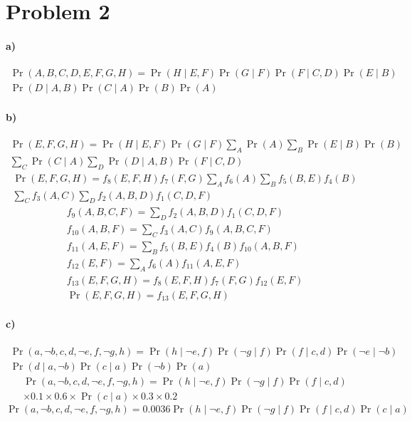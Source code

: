 \documentclass[12pt]{article}
\begin{document}
\section*{Problem 2}

\paragraph{a)}

\begin{multline*}
        \Pr(A,B,C,D,E,F,G,H)=\Pr(H\mid E,F)\Pr(G\mid F)\Pr(F\mid C,D)\Pr(E\mid B)\\
        \Pr(D\mid A,B)\Pr(C\mid A)\Pr(B)\Pr(A)
\end{multline*}

\paragraph{b)}

\begin{multline*}
        \Pr(E,F,G,H)=\Pr(H\mid E,F)\Pr(G\mid F)\sum_A\Pr(A)\sum_B\Pr(E\mid B)\Pr(B)\\
        \sum_C\Pr(C\mid A)\sum_D\Pr(D\mid A,B)\Pr(F\mid C,D)
\end{multline*}
\begin{multline*}
        \Pr(E,F,G,H)=f_8(E,F,H)f_7(F,G)\sum_Af_6(A)\sum_Bf_5(B,E)f_4(B)\\
        \sum_Cf_3(A,C)\sum_Df_2(A,B,D)f_1(C,D,F)
\end{multline*}
\begin{gather*}
        f_9(A,B,C,F)=\sum_Df_2(A,B,D)f_1(C,D,F)\\
        f_{10}(A,B,F)=\sum_Cf_3(A,C)f_9(A,B,C,F)\\
        f_{11}(A,E,F)=\sum_Bf_5(B,E)f_4(B)f_{10}(A,B,F)\\
        f_{12}(E,F)=\sum_Af_6(A)f_{11}(A,E,F)\\
        f_{13}(E,F,G,H)=f_8(E,F,H)f_7(F,G)f_{12}(E,F)\\
        \Pr(E,F,G,H)=f_{13}(E,F,G,H)
\end{gather*}

\paragraph{c)}

\begin{multline*}
        \Pr(a,\lnot b,c,d,\lnot e,f,\lnot g,h)=\Pr(h\mid \lnot e,f)\Pr(\lnot g\mid f)\Pr(f\mid c,d)\Pr(\lnot e\mid \lnot b)\\
        \Pr(d\mid a,\lnot b)\Pr(c\mid a)\Pr(\lnot b)\Pr(a)
\end{multline*}
\begin{multline*}
        \Pr(a,\lnot b,c,d,\lnot e,f,\lnot g,h)=\Pr(h\mid \lnot e,f)\Pr(\lnot g\mid f)\Pr(f\mid c,d)\\
        \times0.1\times0.6\times\Pr(c\mid a)\times0.3\times0.2
\end{multline*}
\[\Pr(a,\lnot b,c,d,\lnot e,f,\lnot g,h)=0.0036\Pr(h\mid \lnot e,f)\Pr(\lnot g\mid f)\Pr(f\mid c,d)\Pr(c\mid a)\]
\end{document}
